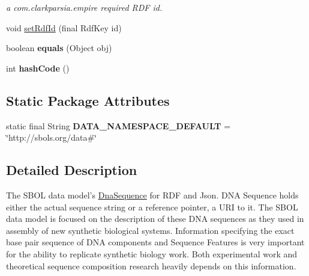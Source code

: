 \begin{DoxyCompactItemize}
\begin{DoxyCompactList}\small\item\em a com.clarkparsia.empire required RDF id. \item\end{DoxyCompactList}\item 
void \hyperlink{classorg_1_1sbolstandard_1_1lib_s_b_o_lj_1_1_dna_sequence_afe8d2a1ced8871ba217ddf364366da99}{setRdfId} (final RdfKey id)
\item 
\hypertarget{classorg_1_1sbolstandard_1_1lib_s_b_o_lj_1_1_dna_sequence_ae3ce8ca5a04e8966a9d2158aeeecfc16}{
boolean {\bfseries equals} (Object obj)}
\label{classorg_1_1sbolstandard_1_1lib_s_b_o_lj_1_1_dna_sequence_ae3ce8ca5a04e8966a9d2158aeeecfc16}

\item 
\hypertarget{classorg_1_1sbolstandard_1_1lib_s_b_o_lj_1_1_dna_sequence_a077e18fe97323c7194e2665ffc766399}{
int {\bfseries hashCode} ()}
\label{classorg_1_1sbolstandard_1_1lib_s_b_o_lj_1_1_dna_sequence_a077e18fe97323c7194e2665ffc766399}

\end{DoxyCompactItemize}
\subsection*{Static Package Attributes}
\begin{DoxyCompactItemize}
\item 
\hypertarget{classorg_1_1sbolstandard_1_1lib_s_b_o_lj_1_1_dna_sequence_a20b86331ad9418b0c6b737a193b5b051}{
static final String {\bfseries DATA\_\-NAMESPACE\_\-DEFAULT} = \char`\"{}http://sbols.org/data\#\char`\"{}}
\label{classorg_1_1sbolstandard_1_1lib_s_b_o_lj_1_1_dna_sequence_a20b86331ad9418b0c6b737a193b5b051}

\end{DoxyCompactItemize}


\subsection{Detailed Description}
The SBOL data model's \hyperlink{classorg_1_1sbolstandard_1_1lib_s_b_o_lj_1_1_dna_sequence}{DnaSequence} for RDF and Json. DNA Sequence holds either the actual sequence string or a reference pointer, a URI to it. The SBOL data model is focused on the description of these DNA sequences as they used in assembly of new synthetic biological systems. Information specifying the exact base pair sequence of DNA components and Sequence Features is very important for the ability to replicate synthetic biology work. Both experimental work and theoretical sequence composition research heavily depends on this information.

